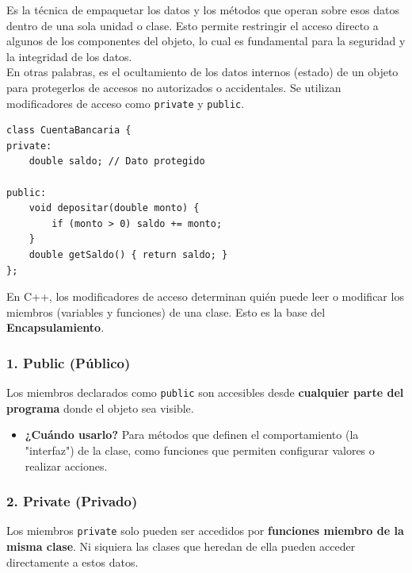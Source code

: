 \documentclass{article}
\begin{document}
    Es la técnica de empaquetar los datos y los métodos que operan
    sobre esos datos dentro de una sola unidad o clase. Esto permite
    restringir el acceso directo a algunos de los componentes del objeto,
    lo cual es fundamental para la seguridad y la integridad de los datos.
\\

    En otras palabras, es el ocultamiento de los datos internos
    (estado) de un objeto para protegerlos de accesos no autorizados
    o accidentales. Se utilizan modificadores de acceso como
    \texttt{private} y \texttt{public}.

    \begin{lstlisting}[caption=Ejemplo de Encapsulamiento]
class CuentaBancaria {
private:
    double saldo; // Dato protegido

public:
    void depositar(double monto) {
        if (monto > 0) saldo += monto;
    }
    double getSaldo() { return saldo; }
};
    \end{lstlisting}

    En C++, los modificadores de acceso determinan quién puede leer o
    modificar los miembros (variables y funciones) de una clase. Esto
    es la base del \textbf{Encapsulamiento}.

    \subsubsection*{1. Public (Público)}

    Los miembros declarados como \texttt{public} son accesibles desde
    \textbf{cualquier parte del programa} donde el objeto sea visible.

    \begin{itemize}
        \item \textbf{¿Cuándo usarlo?} Para métodos que definen el
        comportamiento (la "interfaz") de la clase, como funciones que
        permiten configurar valores o realizar acciones.
    \end{itemize}

    \subsubsection*{2. Private (Privado)}

    Los miembros \texttt{private} solo pueden ser accedidos por
    \textbf{funciones miembro de la misma clase}. Ni siquiera las clases
    que heredan de ella pueden acceder directamente a estos datos.
\end{document}
